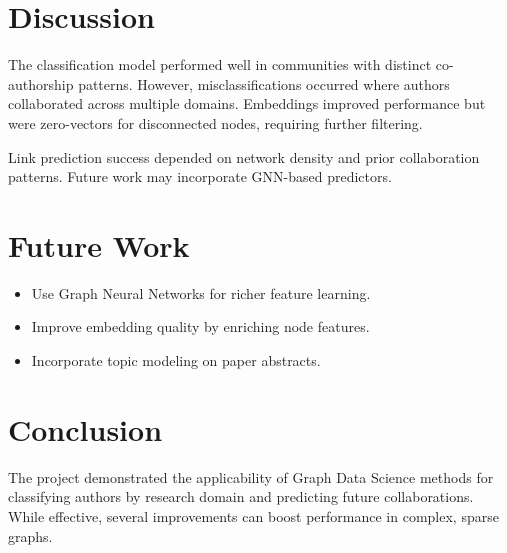 \documentclass[conference, 12pt]{IEEEtran}
\begin{document}
\section{Discussion}
The classification model performed well in communities with distinct co-authorship patterns. However, misclassifications occurred where authors collaborated across multiple domains. Embeddings improved performance but were zero-vectors for disconnected nodes, requiring further filtering.

Link prediction success depended on network density and prior collaboration patterns. Future work may incorporate GNN-based predictors.

\section{Future Work}
\begin{itemize}
  \item Use Graph Neural Networks for richer feature learning.
  \item Improve embedding quality by enriching node features.
  \item Incorporate topic modeling on paper abstracts.
\end{itemize}

\section{Conclusion}
The project demonstrated the applicability of Graph Data Science methods for classifying authors by research domain and predicting future collaborations. While effective, several improvements can boost performance in complex, sparse graphs.


\end{document}
